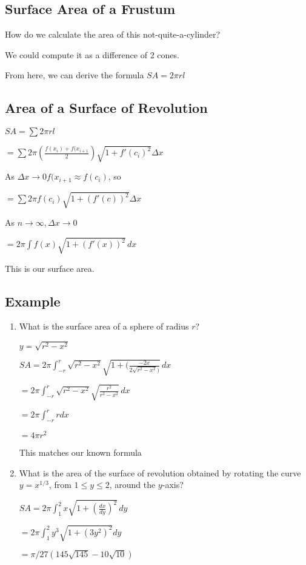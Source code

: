 \documentclass{article}
\begin{document}
\subsection{Surface Area of a Frustum}

How do we calculate the area of this not-quite-a-cylinder?

We could compute it as a difference of 2 cones.

From here, we can derive the formula $SA = 2\pi r l$

\subsection{Area of a Surface of Revolution}
\begin{center}
    
$SA = \sum 2 \pi r l$

$ = \sum 2 \pi (\frac{f(x_i)+f(x_{i+1}}{2}) \sqrt{1+f'(c_i)^2} \Delta x$

As $\Delta x \rightarrow 0 f(x_{i+1} \approx f(c_i)$, so

$ = \sum 2\pi f(c_i) \sqrt{1+(f'(c))^2} \Delta x$

As $n \rightarrow \infty, \Delta x \rightarrow 0$

$ = 2\pi \int f(x) \sqrt{1+(f'(x))^2} \,dx$

\end{center}

This is our surface area.

\subsection{Example}


\begin{enumerate}
    \item What is the surface area of a sphere of radius ${r}$?
    
    \begin{center}
    $y = \sqrt{r^2 - x^2}$
    
    $SA = 2\pi \int_{-r}^{r}
    \sqrt{r^2-x^2}\sqrt{1+(\frac{-2x}{2\sqrt{r^2-x^2})}} \,dx$
    
    $ = 2\pi \int_{-r}^{r} \sqrt{r^2-x^2} \sqrt{\frac{r^2}{r^2-x^2}} \,dx$
    
    $ = 2\pi \int_{-r}^{r} r dx$
    
    $ = 4\pi r^2$
    
    This matches our known formula
    \end{center}
    
    \item What is the area of the surface of revolution obtained by rotating the curve $y=x^{1/3}$, from $1 \leq y \leq 2$, around the $y$-axis?
    
    \begin{center}
        $SA = 2 \pi \int_{1}^{2} x \sqrt{1 + (\frac{dx}{dy})^2} \,dy$
        
        $ = 2 \pi \int_{1}^{2} y^3 \sqrt{1+ (3y^2)^2} dy$
        
        $ = \pi/27(145\sqrt{145} - 10\sqrt{10})$
    \end{center}
\end{enumerate}
\end{document}
